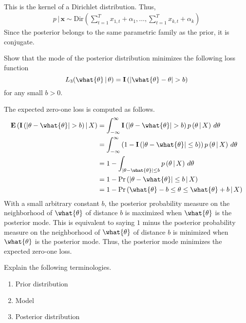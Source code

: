 \documentclass[answers]{exam}
\begin{document}
\begin{questions}
\begin{solution}
\begin{align}
    \end{align}
    This is the kernel of a Dirichlet distribution. Thus,
    \begin{align}
      p\,|\,\mathbf{x} \sim \mathrm{Dir}\left(\sum_{t=1}^{T}x_{1,t}+\alpha_{1},\ldots,\sum_{t=1}^{T}x_{k,t}+\alpha_{k}\right)
    \end{align}
    Since the posterior belongs to the same parametric family as the prior, it is conjugate.
  \end{solution}
  \question
  Show that the mode of the posterior distribution minimizes the following loss function
  \begin{equation}
    L_{3}(\what{\theta}\,|\,\theta)=\mathbf{I}\left(\left|\what{\theta}-\theta\right|>b\right)
  \end{equation}
  for any small $b>0$.
  \begin{solution}
    The expected zero-one loss is computed as follows.
    \begin{align}
      \mathbf{E}\left(\mathbf{I}\left(\left|\theta-\what{\theta}\right|>b\right)\,\middle|\,X\right) &= \int_{-\infty}^{\infty}\mathbf{I}\left(\left|\theta-\what{\theta}\right|>b\right)p\left(\theta\,|\,X\right)\,d\theta\\
      &= \int_{-\infty}^{\infty}\left(1-\mathbf{I}\left(\left|\theta-\what{\theta}\right|\leq b\right)\right)p\left(\theta\,|\,X\right)\,d\theta\\
      &= 1-\int_{\left|\theta-\what{\theta}\right|\leq b} p\left(\theta\,|\,X\right)\,d\theta\\
      &= 1-\Pr\left(\left|\theta-\what{\theta}\right|\leq b\,\middle|\, X\right)\\
      &= 1-\Pr\left(\what{\theta}-b\leq \theta \leq \what{\theta}+b\,\middle|\,X\right)
    \end{align}
    With a small arbitrary constant $b$, the posterior probability measure on the neighborhood of $\what{\theta}$ of distance $b$ is maximized when $\what{\theta}$ is the posterior mode. This is equivalent to saying $1$ minus the posterior probability measure on the neighborhood of $\what{\theta}$ of distance $b$ is minimized when $\what{\theta}$ is the posterior mode. Thus, the posterior mode minimizes the expected zero-one loss.
  \end{solution}
  \question
  Explain the following terminologies.
  \begin{enumerate}[(1)]
    \item Prior distribution
    \item Model
    \item Posterior distribution

\end{enumerate}
\end{questions}
\end{document}
